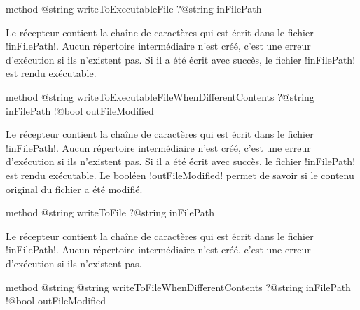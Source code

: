 
\begin{galgasbox}
method @string writeToExecutableFile ?@string inFilePath
\end{galgasbox}

Le récepteur contient la chaîne de caractères qui est écrit dans le fichier \ggs!inFilePath!. Aucun répertoire intermédiaire n'est créé, c'est une erreur d'exécution si ils n'existent pas. Si il a été écrit avec succès, le fichier \ggs!inFilePath! est rendu exécutable.










\begin{galgasbox}
method @string writeToExecutableFileWhenDifferentContents
    ?@string inFilePath
    !@bool outFileModified
\end{galgasbox}

Le récepteur contient la chaîne de caractères qui est écrit dans le fichier \ggs!inFilePath!. Aucun répertoire intermédiaire n'est créé, c'est une erreur d'exécution si ils n'existent pas. Si il a été écrit avec succès, le fichier \ggs!inFilePath! est rendu exécutable. Le booléen \ggs!outFileModified! permet de savoir si le contenu original du fichier a été modifié.










\begin{galgasbox}
method @string writeToFile ?@string inFilePath
\end{galgasbox}

Le récepteur contient la chaîne de caractères qui est écrit dans le fichier \ggs!inFilePath!. Aucun répertoire intermédiaire n'est créé, c'est une erreur d'exécution si ils n'existent pas.










\begin{galgasbox}
method @string @string writeToFileWhenDifferentContents
    ?@string inFilePath
    !@bool outFileModified
\end{galgasbox}

